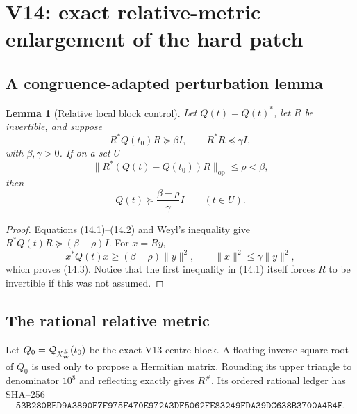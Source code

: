 \documentclass[11pt,oneside]{article}
\newtheorem{lemma}[theorem]{Lemma}
\theoremstyle{definition}
\theoremstyle{remark}
\begin{document}
\section{V14: exact relative-metric enlargement of the hard patch}
\label{sec:newv14-relative}

\subsection{A congruence-adapted perturbation lemma}

\begin{lemma}[Relative local block control]
\label{lem:newv14-relative}
Let \(Q(t)=Q(t)^*\), let \(R\) be invertible, and suppose
\[
 R^*Q(t_0)R\succeq\beta I,\qquad
 R^*R\preceq\gamma I,                                   \tag{14.1}
\]
with \(\beta,\gamma>0\).  If on a set \(U\)
\[
 \|R^*(Q(t)-Q(t_0))R\|_{\mathrm{op}}\le\rho<\beta,        \tag{14.2}
\]
then
\[
 Q(t)\succeq\frac{\beta-\rho}{\gamma}I
 \qquad(t\in U).                                         \tag{14.3}
\]
\end{lemma}

\begin{proof}
Equations (14.1)--(14.2) and Weyl's inequality give
\(R^*Q(t)R\succeq(\beta-\rho)I\).  For \(x=Ry\),
\[
 x^*Q(t)x\ge(\beta-\rho)\|y\|^2,\qquad
 \|x\|^2\le\gamma\|y\|^2,                                \tag{14.4}
\]
which proves (14.3).  Notice that the first inequality in (14.1)
itself forces \(R\) to be invertible if this was not assumed.
\end{proof}

\subsection{The rational relative metric}

Let \(Q_0={\cal Q}_{X_{\mathrm W}^{\#}}(t_0)\) be the exact V13
centre block.  A floating inverse square root of \(Q_0\) is used only
to propose a Hermitian matrix.  Rounding its upper triangle to
denominator \(10^8\) and reflecting exactly gives \(R^\#\).  Its
ordered rational ledger has SHA--256
\[
\texttt{53B280BED9A3890E7F975F470E972A3DF5062FE83249FDA39DC638B3700A4B4E}.
                                                               \tag{14.5}
\]
\end{document}
